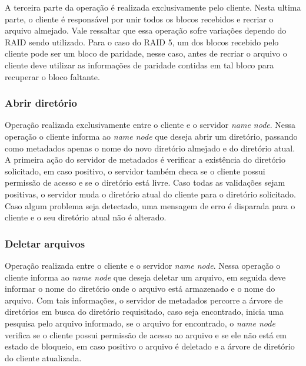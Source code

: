 	A terceira parte da operação é realizada exclusivamente pelo cliente. Nesta ultima parte, o cliente é responsável por unir todos os blocos recebidos e recriar o arquivo almejado.  Vale ressaltar que essa operação sofre variações dependo do RAID sendo utilizado. Para o caso do RAID 5, um dos blocos recebido pelo cliente pode ser um bloco de paridade, nesse caso, antes de recriar o arquivo o cliente deve utilizar as informações de paridade contidas em tal bloco para recuperar o bloco faltante.
	\\
	
	\subsubsection{Abrir diretório}
	 
	 Operação realizada exclusivamente entre o cliente e o servidor \textit{name node}. Nessa operação o cliente informa ao \textit{name node} que deseja abrir um diretório, passando como metadados apenas o nome do novo diretório almejado e do diretório atual. A primeira ação do servidor de metadados é verificar a existência do diretório solicitado, em caso positivo, o servidor também checa se o cliente possui permissão de acesso e se o diretório está livre. Caso todas as validações sejam positivas, o servidor muda o diretório atual do cliente para o diretório solicitado. Caso algum problema seja detectado, uma mensagem de erro é disparada para o cliente e o seu diretório atual não é alterado.
	 \\
	 
	 
	\subsubsection{Deletar arquivos}
	
	Operação realizada entre o cliente e o servidor \textit{name node}. Nessa operação o cliente informa ao \textit{name node} que deseja deletar um arquivo, em seguida deve informar o nome do diretório onde o arquivo está armazenado e o nome do arquivo. Com tais informações, o servidor de metadados percorre a árvore de diretórios em busca do diretório requisitado, caso seja encontrado, inicia uma pesquisa pelo arquivo informado, se o arquivo for encontrado, o \textit{name node} verifica se o cliente possui permissão de acesso ao arquivo e se ele não está em estado de bloqueio, em caso positivo o arquivo é deletado e a árvore de diretório do cliente atualizada.
	\\
	
